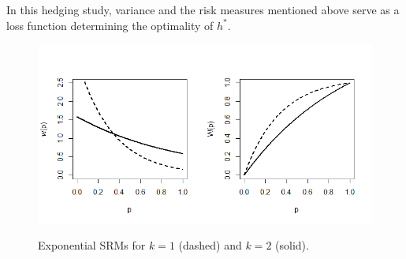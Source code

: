 In this hedging study, variance and the risk measures mentioned above serve as a loss function determining the optimality
of $h^\ast$.

\begin{figure}[h]
	\begin{center}
		\includegraphics[scale = 0.7]{Figures/Fig1-1.png}\\
	\end{center}
	\caption{Exponential SRMs for $k=1$ (dashed) and $k=2$ (solid).}\label{Fig1:EPSRM}
\end{figure}

